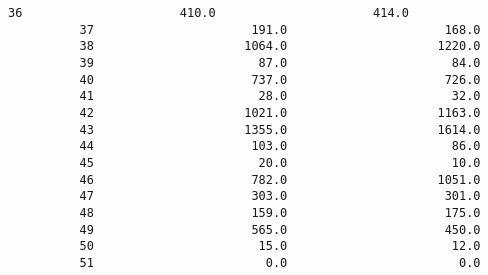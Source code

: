 \documentclass[11pt]{article}
\begin{document}
\begin{Verbatim}[commandchars=\\\{\}]
          36                      410.0                      414.0   
          37                      191.0                      168.0   
          38                     1064.0                     1220.0   
          39                       87.0                       84.0   
          40                      737.0                      726.0   
          41                       28.0                       32.0   
          42                     1021.0                     1163.0   
          43                     1355.0                     1614.0   
          44                      103.0                       86.0   
          45                       20.0                       10.0   
          46                      782.0                     1051.0   
          47                      303.0                      301.0   
          48                      159.0                      175.0   
          49                      565.0                      450.0   
          50                       15.0                       12.0   
          51                        0.0                        0.0   
          

\end{Verbatim}
\end{document}
